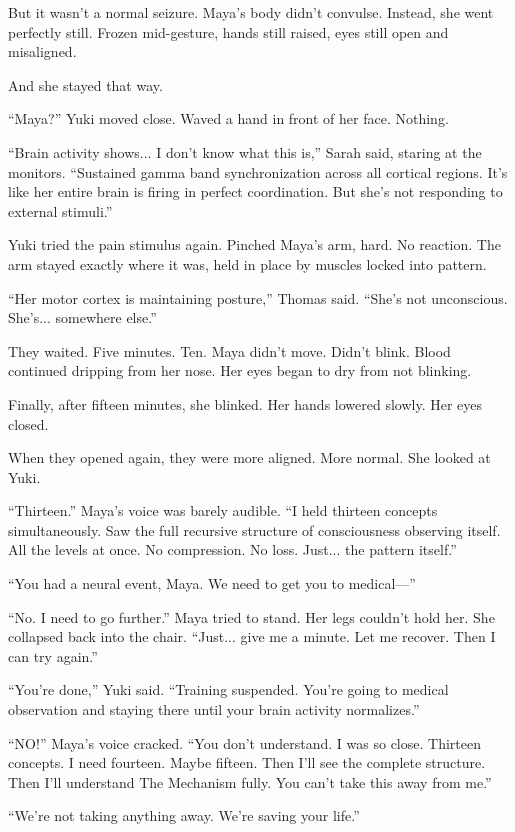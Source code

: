 But it wasn't a normal seizure. Maya's body didn't convulse. Instead, she went perfectly still. Frozen mid-gesture, hands still raised, eyes still open and misaligned.

And she stayed that way.

``Maya?'' Yuki moved close. Waved a hand in front of her face. Nothing.

``Brain activity shows... I don't know what this is,'' Sarah said, staring at the monitors. ``Sustained gamma band synchronization across all cortical regions. It's like her entire brain is firing in perfect coordination. But she's not responding to external stimuli.''

Yuki tried the pain stimulus again. Pinched Maya's arm, hard. No reaction. The arm stayed exactly where it was, held in place by muscles locked into pattern.

``Her motor cortex is maintaining posture,'' Thomas said. ``She's not unconscious. She's... somewhere else.''

They waited. Five minutes. Ten. Maya didn't move. Didn't blink. Blood continued dripping from her nose. Her eyes began to dry from not blinking.

Finally, after fifteen minutes, she blinked. Her hands lowered slowly. Her eyes closed.

When they opened again, they were more aligned. More normal. She looked at Yuki.

``Thirteen.'' Maya's voice was barely audible. ``I held thirteen concepts simultaneously. Saw the full recursive structure of consciousness observing itself. All the levels at once. No compression. No loss. Just... the pattern itself.''

``You had a neural event, Maya. We need to get you to medical—''

``No. I need to go further.'' Maya tried to stand. Her legs couldn't hold her. She collapsed back into the chair. ``Just... give me a minute. Let me recover. Then I can try again.''

``You're done,'' Yuki said. ``Training suspended. You're going to medical observation and staying there until your brain activity normalizes.''

``NO!'' Maya's voice cracked. ``You don't understand. I was so close. Thirteen concepts. I need fourteen. Maybe fifteen. Then I'll see the complete structure. Then I'll understand The Mechanism fully. You can't take this away from me.''

``We're not taking anything away. We're saving your life.''

